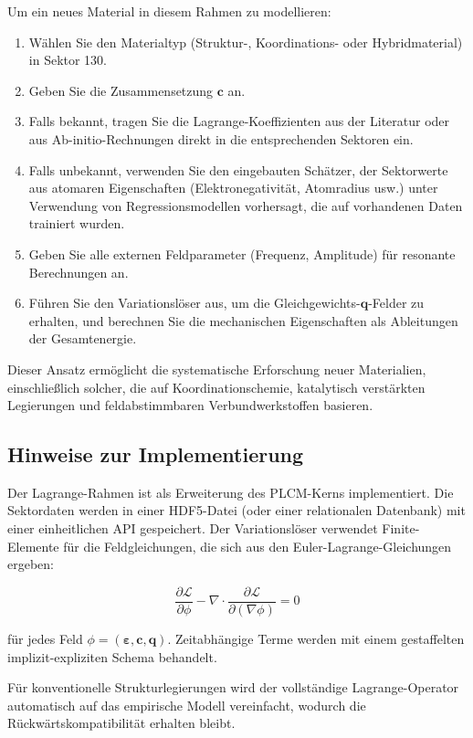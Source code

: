 \documentclass[12pt,a4paper]{article}
\begin{document}
Um ein neues Material in diesem Rahmen zu modellieren:

\begin{enumerate}
\item Wählen Sie den Materialtyp (Struktur-, Koordinations- oder Hybridmaterial) in Sektor 130.
\item Geben Sie die Zusammensetzung \(\mathbf{c}\) an.
\item Falls bekannt, tragen Sie die Lagrange-Koeffizienten aus der Literatur oder aus Ab-initio-Rechnungen direkt in die entsprechenden Sektoren ein.
\item Falls unbekannt, verwenden Sie den eingebauten Schätzer, der Sektorwerte aus atomaren Eigenschaften (Elektronegativität, Atomradius usw.) unter Verwendung von Regressionsmodellen vorhersagt, die auf vorhandenen Daten trainiert wurden.
\item Geben Sie alle externen Feldparameter (Frequenz, Amplitude) für resonante Berechnungen an.
\item Führen Sie den Variationslöser aus, um die Gleichgewichts-\(\mathbf{q}\)-Felder zu erhalten, und berechnen Sie die mechanischen Eigenschaften als Ableitungen der Gesamtenergie.
\end{enumerate}

Dieser Ansatz ermöglicht die systematische Erforschung neuer Materialien, einschließlich solcher, die auf Koordinationschemie, katalytisch verstärkten Legierungen und feldabstimmbaren Verbundwerkstoffen basieren.


\subsection{Hinweise zur Implementierung}
\label{subsec:implementation}

Der Lagrange-Rahmen ist als Erweiterung des PLCM-Kerns implementiert. Die Sektordaten werden in einer HDF5-Datei (oder einer relationalen Datenbank) mit einer einheitlichen API gespeichert. Der Variationslöser verwendet Finite-Elemente für die Feldgleichungen, die sich aus den Euler-Lagrange-Gleichungen ergeben:

\[
\frac{\partial \mathcal{L}}{\partial \phi} - \nabla \cdot \frac{\partial \mathcal{L}}{\partial (\nabla\phi)} = 0
\]

für jedes Feld \(\phi = (\boldsymbol{\varepsilon}, \mathbf{c}, \mathbf{q})\). Zeitabhängige Terme werden mit einem gestaffelten implizit-expliziten Schema behandelt.

Für konventionelle Strukturlegierungen wird der vollständige Lagrange-Operator automatisch auf das empirische Modell vereinfacht, wodurch die Rückwärtskompatibilität erhalten bleibt.
\end{document}
